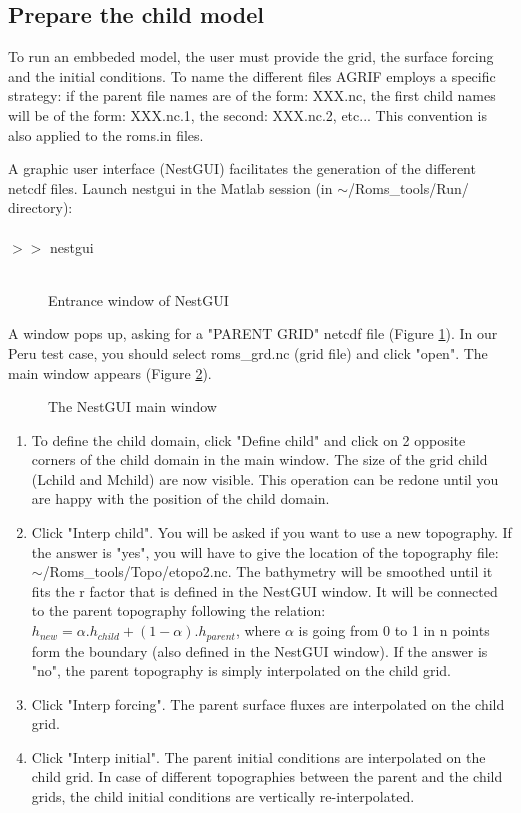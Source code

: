 \subsection{Prepare the child model}

To run an embbeded model, the user must provide the grid, the surface 
forcing and the initial conditions. To name the different files
AGRIF employs a specific strategy: if the parent file names are of
the form: XXX.nc, the first child names will be of the form: 
XXX.nc.1, the second: XXX.nc.2, etc... 
This convention is also applied to the roms.in files.

A graphic user interface (NestGUI) facilitates the generation of the different 
netcdf files. Launch nestgui in the Matlab session 
(in $\sim$/Roms\_tools/Run/ directory):
\\ \\
$>>$ nestgui
\\ \\
\begin{figure}[!ht]
\centerline{}
\caption{Entrance window of NestGUI}
\label{fig:nestgui1}
\end{figure}
A window pops up, asking for a "PARENT GRID" netcdf file 
(Figure \ref{fig:nestgui1}). In our Peru test case, you should select 
roms\_grd.nc (grid file) and click "open".
The main window appears (Figure \ref{fig:nestgui2}). 
\begin{figure}[!ht]
\centerline{}
\caption{The NestGUI main window}
\label{fig:nestgui2}
\end{figure}
\begin{enumerate}
\item To define the child domain, click "Define child" and click on 2 opposite corners
of the child domain in the main window. The size of the grid child
(Lchild and Mchild) are now visible. This operation can be redone 
until you are happy with the position of the child domain.
\item Click "Interp child". You will be asked if you want to use a new topography.
If the answer is "yes", you will have to give the location of the topography file:
$\sim$/Roms\_tools/Topo/etopo2.nc. The bathymetry will be smoothed until it 
fits the r factor \citep{Bec93} that is defined in the NestGUI window.
It will be connected to the parent topography following the relation:
$h_{new}=\alpha.h_{child} + (1-\alpha).h_{parent}$, where $\alpha$ is going from 0
to 1 in n points form the boundary (also defined in the NestGUI window). 
If the answer is "no", the parent topography is simply interpolated 
on the child grid.
\item Click "Interp forcing". The parent surface fluxes are interpolated on
the child grid.
\item Click "Interp initial". The parent initial conditions are interpolated on
the child grid. In case of different topographies between the parent and 
the child grids, the child initial conditions are vertically re-interpolated.
\end{enumerate}

